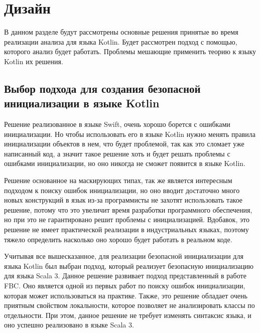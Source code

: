\chapter{Дизайн}\label{ch:дизайн-}

В данном разделе будут рассмотрены основные решения принятые во время реализации анализа для языка Kotlin.
Будет рассмотрен подход с помощью, которого анализ будет работать.
Проблемы мешающие применить теорию к языку Kotlin их решения.


\section{Выбор подхода для создания безопасной инициализации в языке Kotlin}
\label{sec:выбор-подхода-для-создания-безопасной-инициализации-в-языке-kotlin}

Решение реализованное в языке Swift, очень хорошо борется с ошибками инициализации.
Но чтобы использовать его в языке Kotlin нужно менять правила инициализации объектов в нем, что будет проблемой,
так как это сломает уже написанный код, а значит такое решение хоть и будет решать проблемы с ошибками инициализации,
но оно никогда не сможет появится в языке Kotlin.

Решение основанное на маскирующих типах, так же является интересным подходом к поиску ошибок инициализации,
но оно вводит достаточно много новых конструкций в язык из-за программисты не захотят использовать такое решение,
потому что это увеличит время разработки программного обеспечения,
но при это не гарантировано решит проблемы с инициализацией.
Вдобавок, это решение не имеет практической реализации в индустриальных языках,
поэтому тяжело определить насколько оно хорошо будет работать в реальном коде.

Учитывая все вышесказанное, для реализации безопасной инициализации для языка Kotlin был выбран подход,
который реализует безопасную инициализацию для языка Scala 3.
Данное решение развивает подход представленный в работе FBC\@.
Оно является одной из первых работ по поиску ошибок инициализации, которая может использоваться на практике.
Также, это решение обладает очень приятным свойством локальности, которое позволяет не анализировать классы по отдельности.
При этом, данное решение не требует изменять синтаксис языка, и оно успешно реализовано в языке Scala 3.


